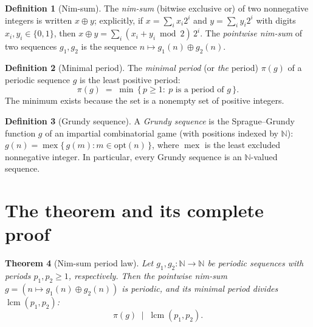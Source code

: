 \documentclass[11pt]{article}
\newtheorem{theorem}{Theorem}[section]
\theoremstyle{definition}
\newtheorem{definition}[theorem]{Definition}
\theoremstyle{remark}
\begin{document}
\begin{definition}[Nim-sum]\label{def:nimsum}
The \emph{nim-sum} (bitwise exclusive or) of two nonnegative integers is written $x \oplus y$; explicitly, if $x = \sum_i x_i 2^i$ and $y = \sum_i y_i 2^i$ with digits $x_i, y_i \in \{0,1\}$, then $x \oplus y = \sum_i (x_i + y_i \bmod 2)\, 2^i$. The \emph{pointwise nim-sum} of two sequences $g_1, g_2$ is the sequence $n \mapsto g_1(n) \oplus g_2(n)$.
\end{definition}

\begin{definition}[Minimal period]\label{def:minperiod}
The \emph{minimal period} (or \emph{the} period) $\pi(g)$ of a periodic sequence $g$ is the least positive period:
\[
\pi(g) \;=\; \min\,\{\, p \ge 1 :\ p \text{ is a period of } g \,\}.
\]
The minimum exists because the set is a nonempty set of positive integers.
\end{definition}

\begin{definition}[Grundy sequence]\label{def:grundy}
A \emph{Grundy sequence} is the Sprague--Grundy function $g$ of an impartial combinatorial game (with positions indexed by $\mathbb{N}$): $g(n) = \operatorname{mex}\{\, g(m) : m \in \mathrm{opt}(n) \,\}$, where $\operatorname{mex}$ is the least excluded nonnegative integer. In particular, every Grundy sequence is an $\mathbb{N}$-valued sequence.
\end{definition}

\section{The theorem and its complete proof}

\begin{theorem}[Nim-sum period law]\label{thm:main}
Let $g_1, g_2 \colon \mathbb{N} \to \mathbb{N}$ be periodic sequences with periods $p_1, p_2 \ge 1$, respectively. Then the pointwise nim-sum $g = (n \mapsto g_1(n) \oplus g_2(n))$ is periodic, and its minimal period divides $\operatorname{lcm}(p_1, p_2)$:
\[
\pi(g) \;\mid\; \operatorname{lcm}(p_1, p_2).
\]
\end{theorem}
\end{document}
